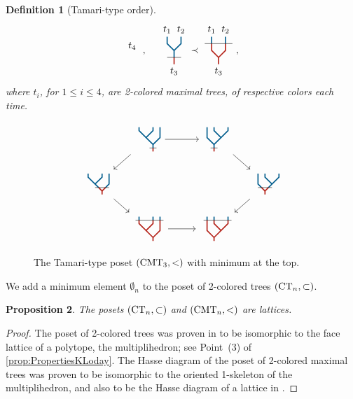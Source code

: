 \documentclass[twoside, 11pt]{amsart}
\newtheorem{definition}{Definition}[section]
\newtheorem{proposition}[definition]{Proposition}
\theoremstyle{remark}
\begin{document}
\begin{definition}[Tamari-type order]
\[{{{\begin{tikzpicture}[yscale=0.5,xscale=0.5]
\draw (0,-0.5) node[below] {$t_4$}; 
\end{tikzpicture}}}}\ , \quad 
{\vcenter{\hbox{
\begin{tikzpicture}[yscale=0.5,xscale=0.5]
\draw[very thick, MidnightBlue] (0,0.5)--(0,1);
\draw[very thick, MidnightBlue] (0,1)--(-0.5,1.5)--(-0.5,2);
\draw[very thick, MidnightBlue] (0,1)--(0.5,1.5)--(0.5,2);
% 
\draw[very thick, BrickRed] (0,0)--(0,0.5);
\draw (-0.5,0.5) --(0.5, 0.5);
%
\draw (-0.5,2) node[above] {$t_1$}; 
\draw (0.5,2) node[above] {$t_2$}; 
\draw (0,0) node[below] {$t_3$}; 
\end{tikzpicture}}}}
\prec
{\vcenter{\hbox{
\begin{tikzpicture}[yscale=0.5,xscale=0.5]
\draw[very thick, MidnightBlue] (-0.5,2)--(-0.5,2.5);
\draw[very thick, MidnightBlue] (0.5,2)--(0.5,2.5);
%
\draw[very thick, BrickRed] (0,0.5)--(0,1);
\draw[very thick, BrickRed] (0,1)--(-0.5,1.5)--(-0.5,2);
\draw[very thick, BrickRed] (0,1)--(0.5,1.5)--(0.5,2);
% 
\draw (-1,2) --(1, 2);
%
\draw (-0.5,2.5) node[above] {$t_1$}; 
\draw (0.5,2.5) node[above] {$t_2$}; 
\draw (0,0.5) node[below] {$t_3$}; 
\end{tikzpicture}}}}
\ ,\]
where $t_i$, for $1\leq i\leq 4$, are 2-colored maximal trees, of respective colors each time. 
\end{definition}

\begin{figure}[h]
\[\vcenter{\hbox{
\begin{tikzcd}[column sep=0.5cm, row sep=0.5cm]
& \TreeLa \arrow[ld, thin] \arrow[rr, thin]&& \TreeRa \arrow[rd, thin]& \\
\TreeLb \arrow[rd, thin] &&&& \TreeRb \arrow[ld, thin] \\
& \TreeLc \arrow[rr, thin] && \TreeRc &
\end{tikzcd}
}}\]
\caption{The Tamari-type poset $(\mathrm{CMT}_{3}, <)$ with minimum at the top.}
\label{Fig3:Tam}
\end{figure}

\noindent We add a minimum element $\emptyset_n$ to the poset of 2-colored trees $(\mathrm{CT}_{n}, \subset)$. 

\begin{proposition}
The posets $(\mathrm{CT}_{n}, \subset)$ and $(\mathrm{CMT}_{n}, <)$ are lattices. 
\end{proposition}

\begin{proof}
The poset of 2-colored trees was proven in \cite{Forcey08} to be isomorphic to the face lattice of a polytope, the multiplihedron; see Point~(3) of \cref{prop:PropertiesKLoday}. 
The Hasse diagram of the poset of 2-colored maximal trees was proven to be isomorphic to the oriented 1-skeleton of the multiplihedron, and also to be the Hasse diagram of a lattice in \cite[Proposition 117]{CP22}.
\end{proof}
\end{document}
